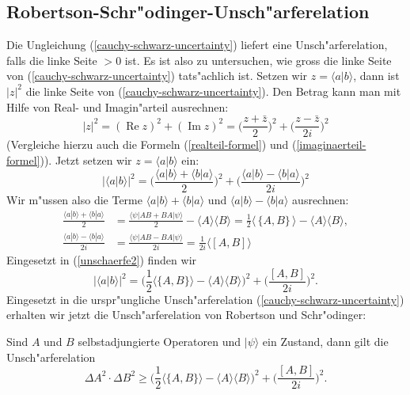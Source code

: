\subsection{Robertson-Schr"odinger-Unsch"arferelation}
Die Ungleichung (\ref{cauchy-schwarz-uncertainty}) liefert eine
Unsch"arferelation, falls die linke Seite $>0$ ist. Es ist
also zu untersuchen, wie gross die linke Seite von 
(\ref{cauchy-schwarz-uncertainty}) tats"achlich ist.
Setzen wir $z=\langle a|b\rangle$, dann ist $|z|^2$ die linke Seite
von (\ref{cauchy-schwarz-uncertainty}). Den Betrag kann man mit Hilfe
von Real- und Imagin"arteil ausrechnen:
\[
|z|^2
=
(\operatorname{Re}z)^2+(\operatorname{Im}z)^2
=
\biggl(\frac{z+\bar z}2\biggr)^2 + \biggl(\frac{z-\bar z}{2i}\biggr)^2
\]
(Vergleiche hierzu auch die Formeln (\ref{realteil-formel}) und 
(\ref{imaginaerteil-formel})).
Jetzt setzen wir $z=\langle a|b\rangle$ ein:
\begin{equation}
|\langle a|b\rangle|^2
=
\biggl(\frac{\langle a|b\rangle + \langle b|a\rangle}2\biggr)^2
+
\biggl(\frac{\langle a|b\rangle - \langle b|a\rangle}{2i}\biggr)^2
\label{unschaerfe2}
\end{equation}
Wir m"ussen also die Terme $\langle a|b\rangle + \langle b|a\rangle$
und $\langle a|b\rangle - \langle b|a\rangle$ ausrechnen:
\begin{align*}
\frac{\langle a|b\rangle + \langle b|a\rangle}2
&=
\frac{
\langle\psi|AB+BA|\psi\rangle 
}2
-\langle A\rangle\langle B\rangle
=
\frac12 \langle\,\{A,B\}\,\rangle - \langle A\rangle\langle B\rangle,
\\
\frac{\langle a|b\rangle - \langle b|a\rangle}{2i}
&=
\frac{\langle\psi|AB-BA|\psi\rangle}{2i}
=
\frac1{2i}\langle [A,B]\rangle
\end{align*}
Eingesetzt in (\ref{unschaerfe2}) finden wir
\[
|\langle a|b\rangle|^2
=
\biggl(
\frac12\langle \{A,B\}\rangle - \langle A\rangle\langle B\rangle
\biggr)^2
+
\biggl(
\frac{[A,B]}{2i}
\biggr)^2.
\]
Eingesetzt in die urspr"ungliche Unsch"arferelation
(\ref{cauchy-schwarz-uncertainty}) erhalten wir jetzt die Unsch"arferelation
von Robertson und Schr"odinger:

\begin{satz}
\label{robertson-schroedinger-unschaerfe}
Sind $A$ und $B$ selbstadjungierte Operatoren und $|\psi\rangle$ ein
Zustand, dann gilt die Unsch"arferelation
\begin{equation}
\Delta A^2\cdot\Delta B^2\ge 
\biggl(
\frac12\langle \{A,B\}\rangle - \langle A\rangle\langle B\rangle
\biggr)^2
+
\biggl(
\frac{[A,B]}{2i}
\biggr)^2.
\label{uncertainty}
\end{equation}
\end{satz}

